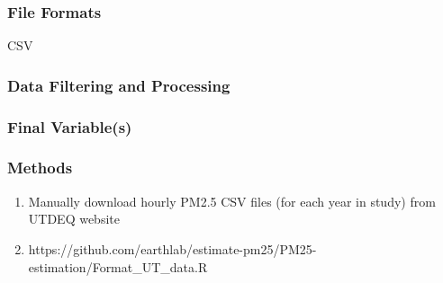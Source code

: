 


\subsubsection*{File Formats} 

CSV

\subsubsection*{Data Filtering and Processing}

\subsubsection*{Final Variable(s)}

\subsubsection*{Methods}

\begin{enumerate}
\item Manually download hourly PM2.5 CSV files (for each year in study) from UTDEQ website
\item https://github.com/earthlab/estimate-pm25/PM25-estimation/Format_UT_data.R
\end{enumerate}

